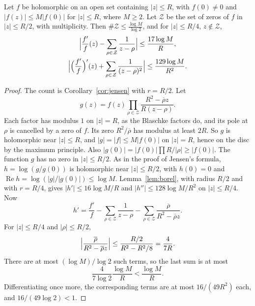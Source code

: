 \begin{lemma}\label{lem:localzeros}
Let $f$ be holomorphic on an open set containing $|z|\le R$, with $f(0)\ne0$ and $|f(z)|\le M|f(0)|$ for $|z|\le R$, where $M\ge2$. Let $\mathcal Z$ be the set of zeros of $f$ in $|z|\le R/2$, with multiplicity. Then $\#\mathcal Z\le\frac{\log M}{\log2}$, and for $|z|\le R/4$, $z\notin\mathcal Z$,
\[
\begin{gathered}\Bigl|\frac{f'}f(z)-\sum_{\rho\in\mathcal Z}\frac1{z-\rho}\Bigr|\le\frac{17\log M}R,\\\Bigl|\Bigl(\frac{f'}f\Bigr)'(z)+\sum_{\rho\in\mathcal Z}\frac1{(z-\rho)^2}\Bigr|\le\frac{129\log M}{R^2}.\end{gathered}
\]
\end{lemma}
\begin{proof}
The count is Corollary~\ref{cor:jensen} with $r=R/2$. Let
\[
g(z)=f(z)\prod_{\rho\in\mathcal Z}\frac{R^2-\overline\rho z}{R(z-\rho)}.
\]
Each factor has modulus $1$ on $|z|=R$, as the Blaschke factors do, and its pole at $\rho$ is cancelled by a zero of $f$. Its zero $R^2/\overline\rho$ has modulus at least $2R$. So $g$ is holomorphic near $|z|\le R$, and $|g|=|f|\le M|f(0)|$ on $|z|=R$, hence on the disc by the maximum principle. Also $|g(0)|=|f(0)|\prod R/|\rho|\ge|f(0)|$. The function $g$ has no zero in $|z|\le R/2$. As in the proof of Jensen's formula, $h=\log(g/g(0))$ is holomorphic near $|z|\le R/2$, with $h(0)=0$ and $\operatorname{Re}h=\log(|g|/|g(0)|)\le\log M$. Lemma~\ref{lem:borel}, with radius $R/2$ and with $r=R/4$, gives $|h'|\le16\log M/R$ and $|h''|\le128\log M/R^2$ on $|z|\le R/4$. Now
\[
h'=\frac{f'}f-\sum_{\rho\in\mathcal Z}\frac1{z-\rho}-\sum_{\rho\in\mathcal Z}\frac{\overline\rho}{R^2-\overline\rho z}.
\]
For $|z|\le R/4$ and $|\rho|\le R/2$,
\[
\Bigl|\frac{\overline\rho}{R^2-\overline\rho z}\Bigr|\le\frac{R/2}{R^2-R^2/8}=\frac4{7R}.
\]
There are at most $(\log M)/\log2$ such terms, so the last sum is at most
\[
\frac{4}{7\log2}\frac{\log M}R<\frac{\log M}R.
\]
Differentiating once more, the corresponding terms are at most $16/(49R^2)$ each, and $16/(49\log2)<1$.
\end{proof}

